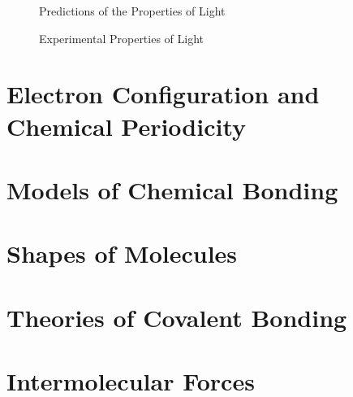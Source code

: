 \documentclass[12pt]{article}
\begin{document}
    \begin{figure}[!ht]%
        \centering
        \qquad
        \caption{Predictions of the Properties of Light}
        \label{fig:experimentallight}%
    \end{figure}
    
    \begin{figure}[!ht]%
        \centering
        \qquad
        \caption{Experimental Properties of Light}
        \label{fig:experimentallight}%
    \end{figure}
\section{Electron Configuration and Chemical Periodicity}

\section{Models of Chemical Bonding}

\section{Shapes of Molecules}

\section{Theories of Covalent Bonding}

\section{Intermolecular Forces}
\end{document}
